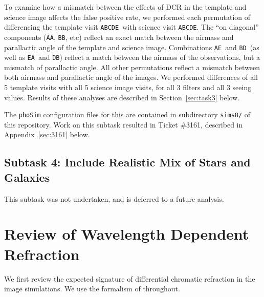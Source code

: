 \documentclass[DM,toc]{lsstdoc}
\def\A{{\tt A}}
\def\B{{\tt B}}
\def\C{{\tt C}}
\def\D{{\tt D}}
\def\E{{\tt E}}
\begin{document}
To examine how a mismatch between the effects of DCR in the template
and science image affects the false positive rate, we performed each
permutation of differencing the template visit \A\B\C\D\E\ with
science visit \A\B\C\D\E.  The ``on diagonal'' components (\A\A, \B\B,
etc) reflect an exact match between the airmass and parallactic angle
of the template and science image.  Combinations \A\E\ and \B\D\ (as
well as \E\A\ and \D\B) reflect a match between the airmass of the
observations, but a mismatch of parallactic angle.  All other
permutations reflect a mismatch between both airmass and parallactic
angle of the images.  We performed differences of all 5 template
visits with all 5 science image visits, for all 3 filters and all 3
seeing values.  Results of these analyses are described in
Section~\ref{sec:task3} below.

The {\tt phoSim} configuration files for this are contained in
subdirectory {\tt sims8/} of this repository.  Work on this subtask
resulted in Ticket \#3161, described in Appendix~\ref{sec:3161} below.

\subsection{Subtask 4: Include Realistic Mix of Stars and Galaxies}

This subtask was not undertaken, and is deferred to a future analysis.

\section{Review of Wavelength Dependent Refraction \label{sec:theory}}

We first review the expected signature of differential chromatic
refraction in the image simulations.  We use the formalism of
\citet{1982PASP...94..715F} throughout.
\end{document}
